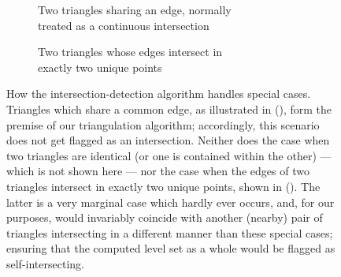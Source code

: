 \begin{figure}[htpb]
    \centering
    \begin{subfigure}[b]{0.45\textwidth}
        \centering
        \resizebox{0.9\textwidth}{!}{}
        \caption[]{Two triangles sharing an edge, normally\\\phantom{(a) }
        treated as a continuous intersection}
        \label{fig:mollertrumbore_vertexshared}
    \end{subfigure}
    \begin{subfigure}[b]{0.45\textwidth}
        \centering
        \resizebox{0.9\textwidth}{!}{}
        \caption[]{Two triangles whose edges intersect in\\\phantom{(b) } exactly
            two unique points
        }
        \label{fig:mollertrumbore_dualisect}
    \end{subfigure}
    \caption[How the intersection-detection algorithm handles special cases]
    {How the intersection-detection algorithm handles special cases.
        Triangles which share a common edge, as illustrated in
        (), form the premise of our
        triangulation algorithm; accordingly, this scenario does not get flagged
        as an intersection. Neither does the case when two triangles are
        identical (or one is contained within the other) --- which is not shown
        here --- nor the case when the edges of two triangles intersect in
        exactly two unique points, shown in
        (). The latter is a very marginal
        case which hardly ever occurs, and, for our purposes, would invariably
        coincide with another (nearby) pair of triangles intersecting in a
        different manner than these special cases; ensuring that the computed
        level set as a whole would be flagged as self-intersecting.}
    \label{fig:mollertrumbore_specialcases}
\end{figure}

